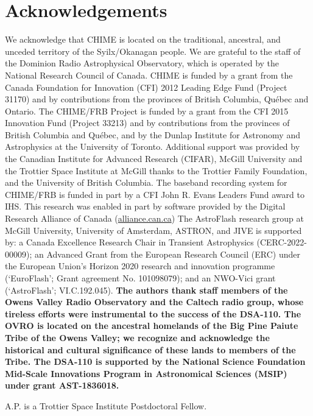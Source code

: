 \documentclass[twocolumn, linenumbers]{aastex701}
\newcommand{\newchange}[1]{{\color{red}\textbf{#1}}}
\begin{document}
\section*{Acknowledgements}
We acknowledge that CHIME is located on the traditional, ancestral, and unceded territory of the Syilx/Okanagan people. We are grateful to the staff of the Dominion Radio Astrophysical Observatory, which is operated by the National Research Council of Canada. CHIME is funded by a grant from the Canada Foundation for Innovation (CFI) 2012 Leading Edge Fund (Project 31170) and by contributions from the provinces of British Columbia, Québec and Ontario. The CHIME/FRB Project is funded by a grant from the CFI 2015 Innovation Fund (Project 33213) and by contributions from the provinces of British Columbia and Québec, and by the Dunlap Institute for Astronomy and Astrophysics at the University of Toronto. Additional support was provided by the Canadian Institute for Advanced Research (CIFAR), McGill University and the Trottier Space Institute at McGill thanks to the Trottier Family Foundation, and the University of British Columbia. The baseband recording system for CHIME/FRB is funded in part by a CFI John R. Evans Leaders Fund award to IHS. This research was enabled in part by software provided by the Digital Research Alliance of Canada (\href{https://alliancecan.ca/}{alliance.can.ca}) The AstroFlash research group at McGill University, University of Amsterdam, ASTRON, and JIVE is supported by: a Canada Excellence Research Chair in Transient Astrophysics (CERC-2022-00009); an Advanced Grant from the European Research Council (ERC) under the European Union's Horizon 2020 research and innovation programme (`EuroFlash'; Grant agreement No. 101098079); and an NWO-Vici grant (`AstroFlash'; VI.C.192.045).
\newchange{The authors thank staff members of the Owens Valley Radio Observatory and the Caltech radio group, whose tireless efforts were instrumental to the success of the DSA-110. The OVRO is located on the ancestral homelands of the Big Pine Paiute Tribe of the Owens Valley; we recognize and acknowledge the historical and cultural significance of these lands to members of the Tribe. The DSA-110 is supported by the National Science Foundation Mid-Scale Innovations Program in Astronomical Sciences (MSIP) under grant AST-1836018.}

A.P. is a Trottier Space Institute Postdoctoral Fellow.




{}

\end{document}
